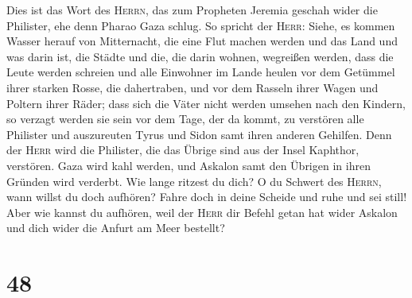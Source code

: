  Dies ist das Wort des \textsc{Herrn}, das zum Propheten
Jeremia geschah wider die Philister, ehe denn Pharao Gaza schlug.
 So spricht der \textsc{Herr}: Siehe, es kommen Wasser
herauf von Mitternacht, die eine Flut machen werden und das Land und was
darin ist, die Städte und die, die darin wohnen, wegreißen werden, dass
die Leute werden schreien und alle Einwohner im Lande heulen
 vor dem Getümmel ihrer starken Rosse, die dahertraben,
und vor dem Rasseln ihrer Wagen und Poltern ihrer Räder; dass sich die
Väter nicht werden umsehen nach den Kindern, so verzagt werden sie sein
 vor dem Tage, der da kommt, zu verstören alle Philister
und auszureuten Tyrus und Sidon samt ihren anderen Gehilfen. Denn der
\textsc{Herr} wird die Philister, die das Übrige sind aus der Insel
Kaphthor, verstören.  Gaza wird kahl werden, und Askalon
samt den Übrigen in ihren Gründen wird verderbt. Wie lange ritzest du
dich?  O du Schwert des \textsc{Herrn}, wann willst du
doch aufhören? Fahre doch in deine Scheide und ruhe und sei still!
 Aber wie kannst du aufhören, weil der \textsc{Herr} dir
Befehl getan hat wider Askalon und dich wider die Anfurt am Meer
bestellt?

\hypertarget{section-47}{%
\section{48}\label{section-47}}


